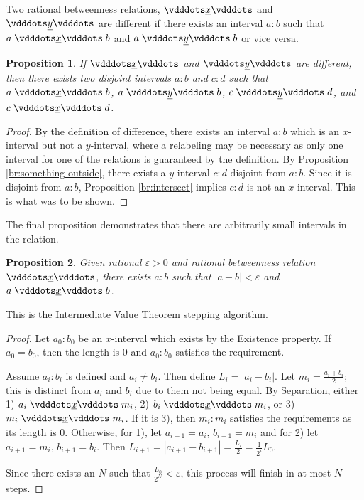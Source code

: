\documentclass[12pt]{article}
\newtheorem{proposition}{Proposition}[section]
\begin{document}
Two rational betweenness relations, $\xrel$ and $\xrel[y]$ are different if there exists an interval $a:b$ such that $a \xrel b$ and \sout{$a \xrel[y] b$} or vice versa. 

\begin{proposition}\label{br:different}
    If $\xrel$ and $\xrel[y]$ are different, then there exists two disjoint intervals $a:b$ and $c:d$ such that $a \xrel b$, \sout{$a \xrel[y] b$}, $c \xrel[y] d$, and \sout{$c \xrel d$}.
\end{proposition}


\begin{proof}
    By the definition of difference, there exists an interval $a:b$ which is an $x$-interval but not a $y$-interval, where a relabeling may be necessary as only one interval for one of the relations is guaranteed by the definition. By Proposition \ref{br:something-outside}, there exists a $y$-interval $c:d$ disjoint from $a:b$. Since it is disjoint from $a:b$, Proposition \ref{br:intersect} implies $c:d$ is not an $x$-interval. This is what was to be shown. 
\end{proof}


The final proposition demonstrates that there are arbitrarily small intervals in the relation. 

\begin{proposition}
    Given rational $\varepsilon >0$ and rational betweenness relation $\xrel$, there exists $a:b$ such that $|a-b| < \varepsilon$ and $a \xrel b$. 
\end{proposition}

This is the Intermediate Value Theorem stepping algorithm. 

\begin{proof}
    Let $a_0:b_0$ be an $x$-interval which exists by the Existence property. If $a_0 = b_0$, then the length is 0 and $a_0:b_0$ satisfies the requirement. 
    
    Assume $a_i:b_i$ is defined and $a_i \neq b_i$. Then define $L_i = |a_i - b_i|$. Let $m_i = \frac{a_i + b_i}{2}$; this is distinct from $a_i$ and $b_i$ due to them not being equal. By Separation, either 1) $a_i \xrel m_i$, 2) $b_i \xrel m_i$, or 3) $m_i \xrel m_i$. If it is 3), then $m_i:m_i$ satisfies the requirements as its length is 0. Otherwise, for 1), let $a_{i+1}= a_i$, $b_{i+1} = m_i$ and for 2) let $a_{i+1} = m_i$, $b_{i+1} = b_i$. Then $L_{i+1} = |a_{i+1} - b_{i+1}| = \frac{L_i}{2} = \frac{1}{2^{i}} L_0 $. 

    Since there exists an $N$ such that $\frac{L_0}{2^N} < \varepsilon$, this process will finish in at most $N$ steps. 
\end{proof}
\end{document}
